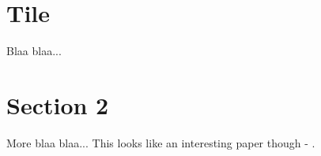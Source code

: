 \documentclass{simons}
\begin{document}
\section{Tile}
\label{project-title}

Blaa blaa...

\section{Section 2}
\label{aims-and-background}

More blaa blaa... This looks like an interesting paper though - \citet{Mutch:2016}.



\end{document}

